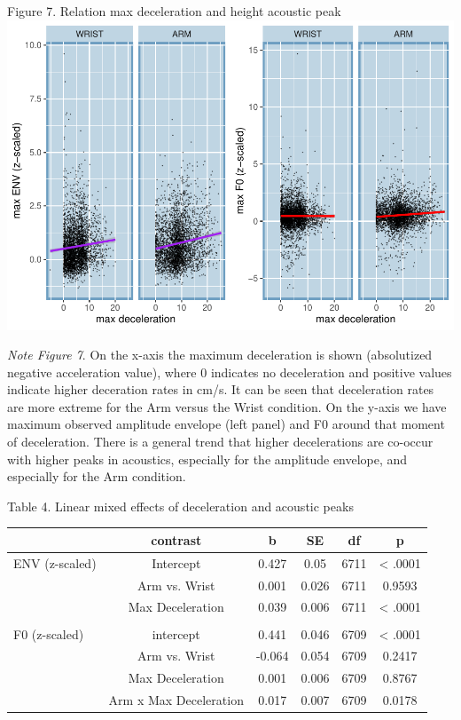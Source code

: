 \documentclass[
  man,floatsintext]{apa6}
\begin{document}
Figure 7. Relation max deceleration and height acoustic peak
\includegraphics{GS_physics_in_fluid_speech_files/figure-latex/impact analysis-1.pdf}

\emph{Note Figure 7}. On the x-axis the maximum deceleration is shown (absolutized negative acceleration value), where 0 indicates no deceleration and positive values indicate higher deceration rates in cm/s. It can be seen that deceleration rates are more extreme for the Arm versus the Wrist condition. On the y-axis we have maximum observed amplitude envelope (left panel) and F0 around that moment of deceleration. There is a general trend that higher decelerations are co-occur with higher peaks in acoustics, especially for the amplitude envelope, and especially for the Arm condition.\\
\newpage

Table 4. Linear mixed effects of deceleration and acoustic peaks

\begin{tabular}{lccccc}
\toprule
  & contrast & b & SE & df & p\\
\midrule
ENV (z-scaled) & Intercept & 0.427 & 0.05 & 6711 & < .0001\\
 & Arm vs. Wrist & 0.001 & 0.026 & 6711 & 0.9593\\
 & Max Deceleration & 0.039 & 0.006 & 6711 & < .0001\\
 &  &  &  &  & \\
F0 (z-scaled) & intercept & 0.441 & 0.046 & 6709 & < .0001\\
\addlinespace
 & Arm vs. Wrist & -0.064 & 0.054 & 6709 & 0.2417\\
 & Max Deceleration & 0.001 & 0.006 & 6709 & 0.8767\\
 & Arm x Max Deceleration & 0.017 & 0.007 & 6709 & 0.0178\\
\bottomrule
\end{tabular}
\end{document}
